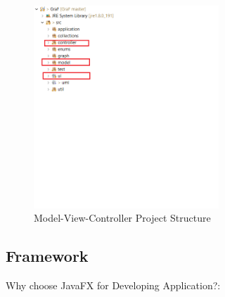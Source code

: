 \documentclass[a4paper,10pt]{article}
\begin{document}
\paragraph{}
\begin{figure}[H]
		\centering
		\includegraphics[height = 3in]{structure.png}
		\caption[Optional caption]{Model-View-Controller Project Structure}
		\label{fig:Repository}
	\end{figure}
\paragraph{}


\subsection{Framework} 
Why choose JavaFX for Developing Application?:
\end{document}
